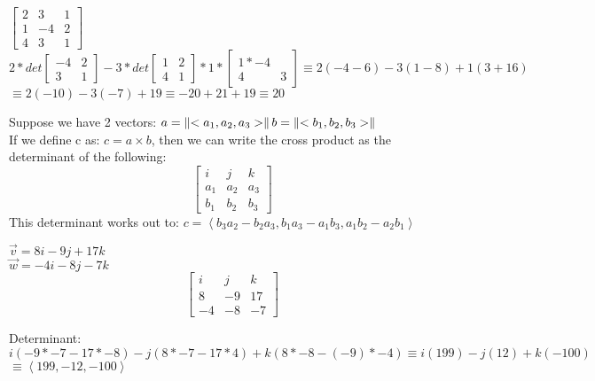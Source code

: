 \documentclass[]{article}
\begin{document}
    $\begin{bmatrix}
        2&3&1\\1&-4&2\\4&3&1
    \end{bmatrix}$
    $2 * det\begin{bmatrix} -4&2\\3&1\end{bmatrix}-3*det\begin{bmatrix}
        1&2\\4&1
    \end{bmatrix} * 1*\begin{bmatrix}
        1*-4\\4&3
    \end{bmatrix} \equiv 2(-4-6)-3(1-8)+1(3+16)$\\
    $\equiv 2(-10)-3(-7)+19 \equiv-20+21+19 \equiv 20$

    Suppose we have 2 vectors: $a=\left\lVert<a_1,a_2,a_3>\right\rVert \\ b=\left\lVert<b_1,b_2,b_3>\right\rVert$\\
    If we define c as: $c = a\times b$, then we can write the cross product as the determinant of the following:
    \begin{equation*}
        \begin{bmatrix}
            i&j&k\\
            a_1&a_2&a_3\\
            b_1&b_2&b_3
        \end{bmatrix}
    \end{equation*}
    This determinant works out to:
    $c=\left\langle b_3a_2-b_2a_3, b_1a_3-a_1b_3, a_1b_2-a_2b_1\right\rangle$

    $\vec{v} = 8i-9j+17k$\\
    $\vec{w} = -4i-8j-7k$\\
    \begin{equation*}
        \begin{bmatrix}
            
        i &j &k\\
        8 &-9 &17\\
        -4&-8&-7
    \end{bmatrix}
    \end{equation*}

    Determinant: $i(-9*-7-17*-8) - j(8*-7 - 17 * 4) + k(8*-8-(-9)*-4) \equiv i(199) - j(12) + k(-100)$\\
    $\equiv \left\langle 199, -12, -100 \right\rangle$\\
\end{document}
